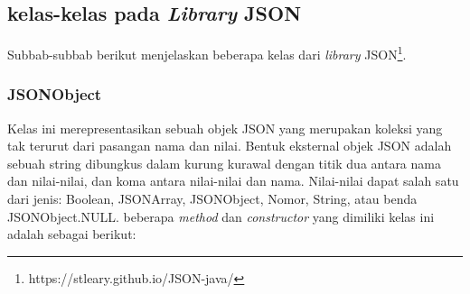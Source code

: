\subsection{kelas-kelas pada \textit{Library} JSON}
\label{subsec:jsonclasses}
Subbab-subbab berikut menjelaskan beberapa kelas dari \textit{library} JSON\footnote{https://stleary.github.io/JSON-java/}.

\subsubsection{JSONObject}
\label{subsubsec:jsonobject}
Kelas ini merepresentasikan sebuah objek JSON yang merupakan koleksi yang tak terurut dari pasangan nama dan nilai. Bentuk eksternal objek JSON adalah sebuah string dibungkus dalam kurung kurawal dengan titik dua antara nama dan nilai-nilai, dan koma antara nilai-nilai dan nama. Nilai-nilai dapat salah satu dari jenis: Boolean, JSONArray, JSONObject, Nomor, String, atau benda JSONObject.NULL. beberapa \textit{method} dan \textit{constructor} yang dimiliki kelas ini adalah sebagai berikut:

